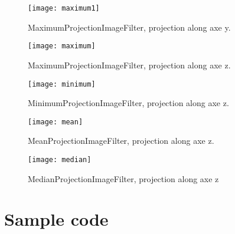 \documentclass{InsightArticle}
\begin{document}
\begin{figure}[htbp]
\centering
\texttt{[image: maximum1]}
\caption{MaximumProjectionImageFilter, projection along axe y.\label{maximum1}}
\end{figure}

\begin{figure}[htbp]
\centering
\texttt{[image: maximum]}
\caption{MaximumProjectionImageFilter, projection along axe z.\label{maximum}}
\end{figure}

\begin{figure}[htbp]
\centering
\texttt{[image: minimum]}
\caption{MinimumProjectionImageFilter, projection along axe z.\label{minimum}}
\end{figure}

\begin{figure}[htbp]
\centering
\texttt{[image: mean]}
\caption{MeanProjectionImageFilter, projection along axe z.\label{mean}}
\end{figure}

\begin{figure}[htbp]
\centering
\texttt{[image: median]}
\caption{MedianProjectionImageFilter, projection along axe z\label{median}}
\end{figure}

\section{Sample code}
\end{document}
